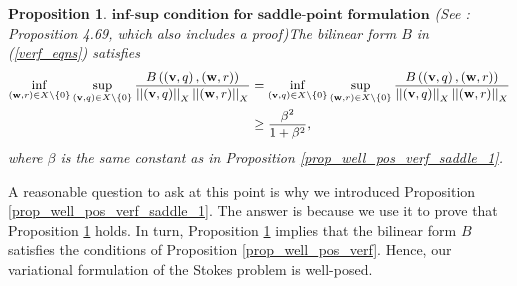 \documentclass[12pt,a4paper]{article}
\newtheorem{proposition}[theorem]{Proposition}
\theoremstyle{definition}
\begin{document}
\begin{proposition}{$\textbf{inf-sup condition for saddle-point formulation}$} (See \cite[\S 4.10]{verfurth2013posteriori}: Proposition 4.69, which also includes a proof)\label{prop_well_pos_verf_saddle}
	The bilinear form $B$ in (\ref{verf_eqns}) satisfies
	\begin{equation}\small
	\begin{aligned}
	\inf_{\left(\textbf{w},r\right)\in X\setminus \lbrace0\rbrace}\sup_{\left(\textbf{v},q\right) \in X\setminus \lbrace0\rbrace}\frac{B\left(\left(\textbf{v},q\right),\left(\textbf{w},r\right)\right)}{\left|\left|\left(\textbf{v},q\right)\right|\right|_X\left|\left|\left(\textbf{w},r\right)\right|\right|_X}&=
	\inf_{\left(\textbf{v},q\right) \in X\setminus \lbrace 0\rbrace}\sup_{\left(\textbf{w},r\right)\in X\setminus \lbrace0\rbrace}\frac{B\left(\left(\textbf{v},q\right),\left(\textbf{w},r\right)\right)}{\left|\left|\left(\textbf{v},q\right)\right|\right|_X\left|\left|\left(\textbf{w},r\right)\right|\right|_X}\\&\geq \frac{\beta^2}{1+\beta^2},\nonumber
	\end{aligned}
	\end{equation}
	where $\beta$ is the same constant as in Proposition \ref{prop_well_pos_verf_saddle_1}.
\end{proposition}
A reasonable question to ask at this point is why we introduced Proposition \ref{prop_well_pos_verf_saddle_1}.  The answer is because we use it to prove that Proposition \ref{prop_well_pos_verf_saddle} holds.  In turn, Proposition \ref{prop_well_pos_verf_saddle} implies that the bilinear form $B$ satisfies the conditions of Proposition \ref{prop_well_pos_verf}.  Hence, our variational formulation of the Stokes problem is well-posed.
\end{document}
